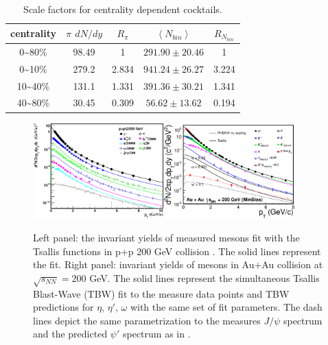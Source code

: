 \begin{table}
\begin{centering}
\begin{tabular}{c|c|c|c|c}
\hline 
centrality & $\pi$ \emph{$dN/dy$} & $R_{\pi}$ & $\left\langle N_{bin}\right\rangle $ & $R_{N_{bin}}$\tabularnewline
\hline 
\hline 
0\textasciitilde{}80\% & 98.49 & 1 & $291.90\pm20.46$ & 1\tabularnewline
\hline 
0\textasciitilde{}10\% & 279.2 & 2.834 & $941.24\pm26.27$ & 3.224\tabularnewline
\hline 
10\textasciitilde{}40\% & 131.1 & 1.331 & $391.36\pm30.21$ & 1.341\tabularnewline
\hline 
40\textasciitilde{}80\% & 30.45 & 0.309 & $56.62\pm13.62$ & 0.194\tabularnewline
\hline 
\end{tabular}
\par\end{centering}

\protect\caption{Scale factors for centrality dependent cocktails.}


\label{table: scale cocktail}
\end{table}


\begin{figure}
\begin{centering}
\includegraphics[width=0.45\textwidth]{fig/3.Analysis/cocktail/11PLUS1mesons_pp_woProton_allPt_new}\includegraphics[width=0.45\textwidth]{fig/3.Analysis/cocktail/AuAu200_inputpT}
\par\end{centering}

\protect\caption{Left panel: the invariant yields of measured mesons fit with the Tsallis
functions in p+p 200 GeV collision \cite{PhysRevC.86.024906}. The
solid lines represent the fit. Right panel: invariant yields of mesons
in Au+Au collision at $\sqrt{s_{NN}}=200$ GeV. The solid lines represent
the simultaneous Tsallis Blast-Wave (TBW) fit to the measure data
points and TBW predictions for $\eta$, $\eta'$, $\omega$ with the
same set of fit parameters. The dash lines depict the same parametrization
to the measures $J/\psi$ spectrum and the predicted $\psi'$ spectrum
as in \cite{PhysRevC.81.034911}.}


\label{fig: cocktail Input}
\end{figure}


